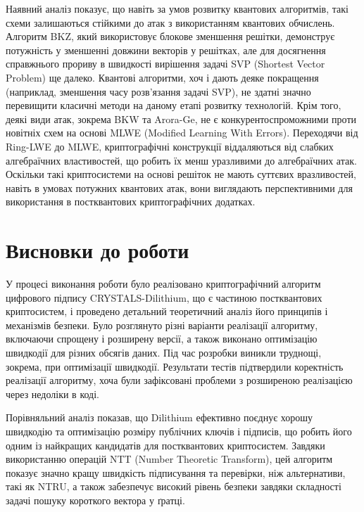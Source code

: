 \documentclass[12pt]{HomusWorkus}
\begin{document}
Наявний аналіз показує, що навіть за умов розвитку квантових алгоритмів, такі схеми залишаються стійкими до атак з використанням квантових обчислень. Алгоритм BKZ, який використовує блокове зменшення решітки, демонструє потужність у зменшенні довжини векторів у решітках, але для досягнення справжнього прориву в швидкості вирішення задачі SVP (Shortest Vector Problem) ще далеко. Квантові алгоритми, хоч і дають деяке покращення (наприклад, зменшення часу розв'язання задачі SVP), не здатні значно перевищити класичні методи на даному етапі розвитку технологій. Крім того, деякі види атак, зокрема BKW та Arora-Ge, не є конкурентоспроможними проти новітніх схем на основі MLWE (Modified Learning With Errors). Переходячи від Ring-LWE до MLWE, криптографічні конструкції віддаляються від слабких алгебраїчних властивостей, що робить їх менш уразливими до алгебраїчних атак. Оскільки такі криптосистеми на основі решіток не мають суттєвих вразливостей, навіть в умовах потужних квантових атак, вони виглядають перспективними для використання в постквантових криптографічних додатках.


\section{Висновки до роботи}

У процесі виконання роботи було реалізовано криптографічний алгоритм цифрового підпису CRYSTALS-Dilithium, що є частиною постквантових криптосистем, і проведено детальний теоретичний аналіз його принципів і механізмів безпеки. Було розглянуто різні варіанти реалізації алгоритму, включаючи спрощену і розширену версії, а також виконано оптимізацію швидкодії для різних обсягів даних. Під час розробки виникли труднощі, зокрема, при оптимізації швидкодії. Результати тестів підтвердили коректність реалізації алгоритму, хоча були зафіксовані проблеми з розширеною реалізацією через недоліки в коді.

Порівняльний аналіз показав, що Dilithium ефективно поєднує хорошу швидкодію та оптимізацію розміру публічних ключів і підписів, що робить його одним із найкращих кандидатів для постквантових криптосистем. Завдяки використанню операцій NTT (Number Theoretic Transform), цей алгоритм показує значно кращу швидкість підписування та перевірки, ніж альтернативи, такі як NTRU, а також забезпечує високий рівень безпеки завдяки складності задачі пошуку короткого вектора у ґратці.




% 
% 
\end{document}
